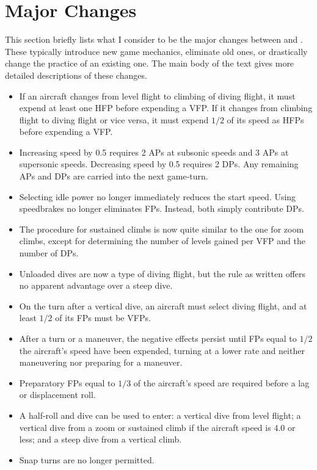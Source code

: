 \documentclass[10pt]{extarticle}
\begin{document}
\section{Major Changes}

This section briefly lists what I consider to be the major changes between {\AS} and {\AP}. These  typically introduce new game mechanics, eliminate old ones, or drastically change the practice of an existing one. The main body of the text gives more detailed descriptions of these changes.

\begin{itemize}
    \item If an aircraft changes from level flight to climbing of diving flight, it must expend at least one HFP before expending a VFP. If it changes from climbing flight to diving flight or vice versa, it must expend $1/2$ of its speed as HFPs before expending a VFP.
    \item Increasing speed by 0.5 requires 2 APs at subsonic speeds and 3 APs at supersonic speeds. Decreasing speed by 0.5 requires 2 DPs. Any remaining APs and DPs are carried into the next game-turn.
    \item Selecting idle power no longer immediately reduces the start speed. Using speedbrakes no longer eliminates FPs. Instead, both simply contribute DPs.
    \item The procedure for sustained climbs is now quite similar to the one for zoom climbs, except for determining the number of levels gained per VFP and the number of DPs.
    \item Unloaded dives are now a type of diving flight, but the rule as written offers no apparent advantage over a steep dive.
    \item On the turn after a vertical dive, an aircraft must select diving flight, and at least $1/2$ of its FPs must be VFPs.
    \item After a turn or a maneuver, the negative effects persist until FPs equal to $1/2$ the aircraft's speed have been expended, turning at a lower rate and neither maneuvering nor preparing for a maneuver.
    \item Preparatory FPs equal to $1/3$ of the aircraft's speed are required before a lag or displacement roll.
    \item A half-roll and dive can be used to enter: a vertical dive from level flight; a vertical dive from a zoom or sustained climb if the aircraft speed is 4.0 or less; and a steep dive from a vertical climb.
    \item Snap turns are no longer permitted.
\end{itemize}
\end{document}
